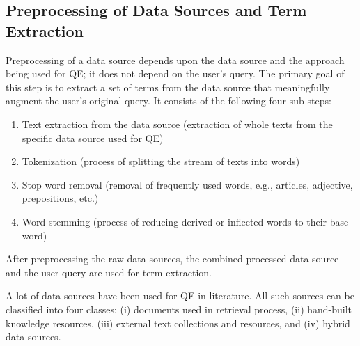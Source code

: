 \subsection{Preprocessing of Data Sources and Term Extraction}
Preprocessing of a data source depends upon the data source and the approach being used for QE; it does not depend on the user's query. The primary goal of this step is to extract a set of terms from the data source that meaningfully augment the user's original query.  It consists of the following four sub-steps:
\begin{enumerate}
	\item Text extraction from the data source (extraction of whole texts from the specific data source used for QE)
	\item Tokenization (process of splitting the stream of texts into words)
	\item Stop word removal (removal of frequently used words, e.g., articles, adjective, prepositions, etc.)
	\item Word stemming (process of reducing derived or inflected words to their base word)
\end{enumerate}
After preprocessing the raw data sources, the combined processed data source and the user query are used for term extraction. 

A lot of data sources have been used for QE in literature. All such sources can be classified into four classes: (i) documents used in retrieval process, (ii) hand-built knowledge resources, (iii) external text collections and resources, and (iv) hybrid data sources.

